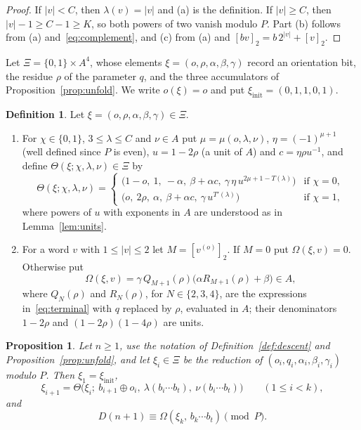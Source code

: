 \documentclass{amsart}
\newtheorem{proposition}[theorem]{Proposition}
\theoremstyle{definition}
\newtheorem{definition}[theorem]{Definition}
\theoremstyle{remark}
\numberwithin{equation}{section}
\newcommand{\val}[1]{[#1]_2}
\begin{document}
\begin{proof}
If $|v|<C$, then $\lambda(v)=|v|$ and (a) is the definition. If $|v|\ge C$, then $|v|-1\ge C-1\ge K$, so both powers of two vanish modulo $P$. Part (b) follows from (a) and~\eqref{eq:complement}, and (c) from (a) and $\val{bv}=b\,2^{|v|}+\val{v}$.
\end{proof}

Let $\Xi=\{0,1\}\times A^4$, whose elements $\xi=(o,\rho,\alpha,\beta,\gamma)$ record an orientation bit, the residue $\rho$ of the parameter $q$, and the three accumulators of Proposition~\ref{prop:unfold}. We write $o(\xi)=o$ and put $\xi_{\mathrm{init}}=(0,1,1,0,1)$.

\begin{definition}\label{def:theta}
Let $\xi=(o,\rho,\alpha,\beta,\gamma)\in\Xi$.
\begin{enumerate}
\item[(a)] For $\chi\in\{0,1\}$, $3\le\lambda\le C$ and $\nu\in A$ put $\mu=\mu(o,\lambda,\nu)$, $\eta=(-1)^{\mu+1}$ (well defined since $P$ is even), $u=1-2\rho$ (a unit of $A$) and $c=\eta\rho u^{-1}$, and define $\Theta(\xi;\chi,\lambda,\nu)\in\Xi$ by
\[
\Theta(\xi;\chi,\lambda,\nu)=
\begin{cases}
\bigl(1-o,\ 1,\ -\alpha,\ \beta+\alpha c,\ \gamma\,\eta\,u^{2\mu+1-T(\lambda)}\bigr)&\text{if }\chi=0,\\
\bigl(o,\ 2\rho,\ \alpha,\ \beta+\alpha c,\ \gamma\,u^{T'(\lambda)}\bigr)&\text{if }\chi=1,
\end{cases}
\]
where powers of $u$ with exponents in $A$ are understood as in Lemma~\ref{lem:units}.
\item[(b)] For a word $v$ with $1\le|v|\le2$ let $M=\val{v^{(o)}}$. If $M=0$ put $\Omega(\xi,v)=0$. Otherwise put
\[
\Omega(\xi,v)=\gamma\,Q_{M+1}(\rho)\bigl(\alpha R_{M+1}(\rho)+\beta\bigr)\in A,
\]
where $Q_N(\rho)$ and $R_N(\rho)$, for $N\in\{2,3,4\}$, are the expressions in~\eqref{eq:terminal} with $q$ replaced by $\rho$, evaluated in $A$; their denominators $1-2\rho$ and $(1-2\rho)(1-4\rho)$ are units.
\end{enumerate}
\end{definition}

\begin{proposition}\label{prop:reduced}
Let $n\ge1$, use the notation of Definition~\ref{def:descent} and Proposition~\ref{prop:unfold}, and let $\xi_i\in\Xi$ be the reduction of $(o_i,q_i,\alpha_i,\beta_i,\gamma_i)$ modulo $P$. Then $\xi_1=\xi_{\mathrm{init}}$,
\[
\xi_{i+1}=\Theta\bigl(\xi_i;\ b_{i+1}\oplus o_i,\ \lambda(b_i\cdots b_t),\ \nu(b_i\cdots b_t)\bigr)\qquad(1\le i<k),
\]
and
\[
D(n+1)\equiv\Omega(\xi_k,\,b_k\cdots b_t)\pmod P.
\]
\end{proposition}
\end{document}
